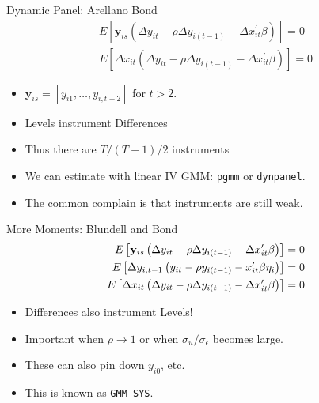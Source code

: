 \documentclass[xcolor=pdftex,dvipsnames,table,mathserif,aspectratio=169]{beamer}
\begin{document}
\begin{frame}{Dynamic Panel: Arellano Bond}
\begin{eqnarray*}
E\left[\mathbf{y}_{i s}\left(\Delta y_{i t}-\rho \Delta y_{i(t-1)}-\Delta x_{i t}^{\prime} \beta\right)\right]=0\\
E\left[\Delta x_{it} \left(\Delta y_{i t}-\rho \Delta y_{i(t-1)}-\Delta x_{i t}^{\prime} \beta\right)\right]=0
\end{eqnarray*}
\begin{itemize}
\item $\mathbf{y}_{is}= [y_{i1},\ldots,y_{i,t-2}]$ for $t>2$.
\item \alert{Levels} instrument \alert{Differences}
\item Thus there are $T/(T-1)/2$ instruments
\item We can estimate with linear IV GMM:  \texttt{pgmm} or \texttt{dynpanel}.
\item The common complain is that \alert{instruments are still weak}.
\end{itemize}
\end{frame}

\begin{frame}{More Moments: Blundell and Bond}
\begin{align*}
E\left[\mathbf{y}_{i s}\left(\Delta y_{i t}-\rho \Delta y_{i(t-1)}-\Delta x_{i t}^{\prime} \beta\right)\right]&=0\\
E\left[\Delta y_{i,t-1} \left(y_{i t}-\rho y_{i(t-1)}- x_{i t}^{\prime} \beta\-\eta_i \right)\right]&=0\\
E\left[\Delta x_{it} \left(\Delta y_{i t}-\rho \Delta y_{i(t-1)}-\Delta x_{i t}^{\prime} \beta\right)\right]&=0
\end{align*}
\begin{itemize}
\item \alert{Differences} also instrument \alert{Levels}!
\item Important when $\rho \rightarrow 1$ or when $\sigma_u/\sigma_{\epsilon}$ becomes large.
\item These can also pin down $y_{i0}$, etc.
\item This is known as \texttt{GMM-SYS}.
\end{itemize}
\end{frame}
\end{document}
